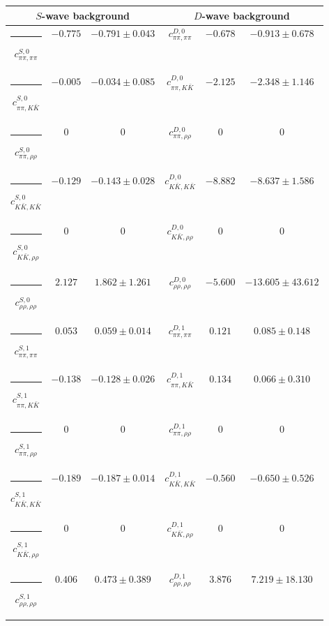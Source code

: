 \begin{table}[h]
\begin{ruledtabular}
\begin{tabular}{c c c c c c c c c}
\end{tabular}
\vspace{2em}
\begin{tabular}{c c c c c c}
\multicolumn{3}{c}{$S$-wave background}  & \multicolumn{3}{c}{$D$-wave background} \\ \hline
\rule[-0.2cm]{-0.1cm}{.55cm} $c^{S,0}_{\pi\pi,\pi\pi}$ &$-0.775$ & $-0.791 \pm 0.043$ & $c^{D,0}_{\pi\pi,\pi\pi}$ &$-0.678$ & $-0.913 \pm 0.678$ \\
\rule[-0.2cm]{-0.1cm}{.55cm} $c^{S,0}_{\pi\pi,K\bar K}$ &$-0.005$ & $-0.034 \pm 0.085$ & $c^{D,0}_{\pi\pi,K\bar K}$ &$-2.125$ & $-2.348 \pm 1.146$ \\
\rule[-0.2cm]{-0.1cm}{.55cm} $c^{S,0}_{\pi\pi,\rho\rho}$ &$0$ & $0$ & $c^{D,0}_{\pi\pi,\rho\rho}$ &$0$ & $0$ \\
\rule[-0.2cm]{-0.1cm}{.55cm} $c^{S,0}_{K\bar K,K\bar K}$ &$-0.129$ & $-0.143 \pm 0.028$ & $c^{D,0}_{K\bar K,K\bar K}$ &$-8.882$ & $-8.637 \pm 1.586$ \\
\rule[-0.2cm]{-0.1cm}{.55cm} $c^{S,0}_{K\bar K,\rho\rho}$ &$0$ & $0$ & $c^{D,0}_{K\bar K,\rho\rho}$ &$0$ & $0$ \\
\rule[-0.2cm]{-0.1cm}{.55cm} $c^{S,0}_{\rho\rho,\rho\rho}$ &$2.127$ & $1.862 \pm 1.261$ & $c^{D,0}_{\rho\rho,\rho\rho}$ &$-5.600$ & $-13.605 \pm 43.612$ \\
\rule[-0.2cm]{-0.1cm}{.55cm} $c^{S,1}_{\pi\pi,\pi\pi}$ &$0.053$ & $0.059 \pm 0.014$ & $c^{D,1}_{\pi\pi,\pi\pi}$ &$0.121$ & $0.085 \pm 0.148$ \\
\rule[-0.2cm]{-0.1cm}{.55cm} $c^{S,1}_{\pi\pi,K\bar K}$ &$-0.138$ & $-0.128 \pm 0.026$ & $c^{D,1}_{\pi\pi,K\bar K}$ &$0.134$ & $0.066 \pm 0.310$ \\
\rule[-0.2cm]{-0.1cm}{.55cm} $c^{S,1}_{\pi\pi,\rho\rho}$ &$0$ & $0$ & $c^{D,1}_{\pi\pi,\rho\rho}$ &$0$ & $0$ \\
\rule[-0.2cm]{-0.1cm}{.55cm} $c^{S,1}_{K\bar K,K\bar K}$ &$-0.189$ & $-0.187 \pm 0.014$ & $c^{D,1}_{K\bar K,K\bar K}$ &$-0.560$ & $-0.650 \pm 0.526$ \\
\rule[-0.2cm]{-0.1cm}{.55cm} $c^{S,1}_{K\bar K,\rho\rho}$ &$0$ & $0$ & $c^{D,1}_{K\bar K,\rho\rho}$ &$0$ & $0$ \\
\rule[-0.2cm]{-0.1cm}{.55cm} $c^{S,1}_{\rho\rho,\rho\rho}$ &$0.406$ & $0.473 \pm 0.389$ & $c^{D,1}_{\rho\rho,\rho\rho}$ &$3.876$ & $7.219 \pm 18.130$ \\
\end{tabular}
\end{ruledtabular}
\end{table}
